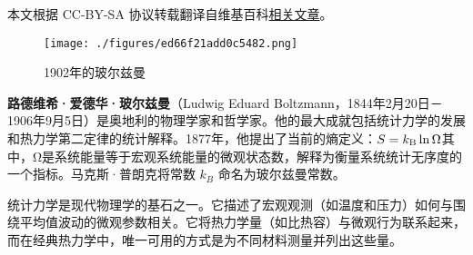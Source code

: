 
本文根据 CC-BY-SA 协议转载翻译自维基百科\href{https://en.wikipedia.org/wiki/Ludwig_Boltzmann}{相关文章}。

\begin{figure}[ht]
\centering
\texttt{[image: ./figures/ed66f21add0c5482.png]}
\caption{1902年的玻尔兹曼} \label{fig_BRZM_1}
\end{figure}
\textbf{路德维希·爱德华·玻尔兹曼}（Ludwig Eduard Boltzmann，1844年2月20日－1906年9月5日）是奥地利的物理学家和哲学家。他的最大成就包括统计力学的发展和热力学第二定律的统计解释。1877年，他提出了当前的熵定义：\(S = k_{\rm B}\ln\Omega \)其中，Ω是系统能量等于宏观系统能量的微观状态数，解释为衡量系统统计无序度的一个指标。马克斯·普朗克将常数 \( k_B \) 命名为玻尔兹曼常数。

统计力学是现代物理学的基石之一。它描述了宏观观测（如温度和压力）如何与围绕平均值波动的微观参数相关。它将热力学量（如比热容）与微观行为联系起来，而在经典热力学中，唯一可用的方式是为不同材料测量并列出这些量。